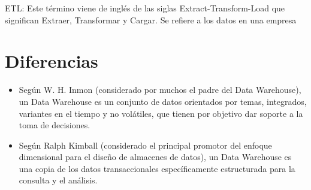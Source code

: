 \documentclass[preprint,12pt]{elsarticle}
\begin{document}
\begin{enumerate}[5.2]
\begin{itemize}
\end{itemize}


\end{enumerate}

ETL: Este término viene de inglés de las siglas Extract-Transform-Load que significan Extraer, Transformar y Cargar. Se refiere a los datos en una empresa
\section{Diferencias}
\begin{itemize}
\item Según W. H. Inmon (considerado por muchos el padre del Data Warehouse), un Data Warehouse es un conjunto de datos orientados por temas, integrados, variantes en el tiempo y no volátiles, que tienen por objetivo dar soporte a la toma de decisiones.
\item Según Ralph Kimball (considerado el principal promotor del enfoque dimensional para el diseño de almacenes de datos), un Data Warehouse es una copia de los datos transaccionales específicamente estructurada para la consulta y el análisis.
\end{itemize}
\end{document}
